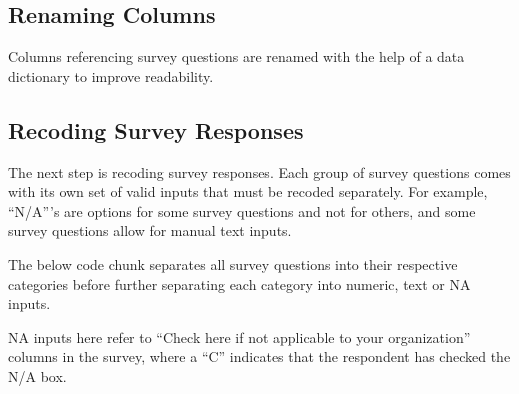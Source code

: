 \documentclass[
  letterpaper,
  DIV=11,
  numbers=noendperiod]{scrreprt}
\newenvironment{Shaded}{\begin{snugshade}}{\end{snugshade}}
\newcommand{\FunctionTok}[1]{\textcolor[rgb]{0.28,0.35,0.67}{#1}}
\newcommand{\NormalTok}[1]{\textcolor[rgb]{0.00,0.23,0.31}{#1}}
\newcommand{\OtherTok}[1]{\textcolor[rgb]{0.00,0.23,0.31}{#1}}
\newcommand{\SpecialCharTok}[1]{\textcolor[rgb]{0.37,0.37,0.37}{#1}}
\begin{document}
\hypertarget{renaming-columns}{%
\subsection{Renaming Columns}\label{renaming-columns}}

Columns referencing survey questions are renamed with the help of a data
dictionary to improve readability.

\begin{Shaded}
\end{Shaded}

\hypertarget{recoding-survey-responses}{%
\subsection{Recoding Survey Responses}\label{recoding-survey-responses}}

The next step is recoding survey responses. Each group of survey
questions comes with its own set of valid inputs that must be recoded
separately. For example, ``N/A'''s are options for some survey questions
and not for others, and some survey questions allow for manual text
inputs.

The below code chunk separates all survey questions into their
respective categories before further separating each category into
numeric, text or NA inputs.

NA inputs here refer to ``Check here if not applicable to your
organization'' columns in the survey, where a ``C'' indicates that the
respondent has checked the N/A box.
\end{document}
